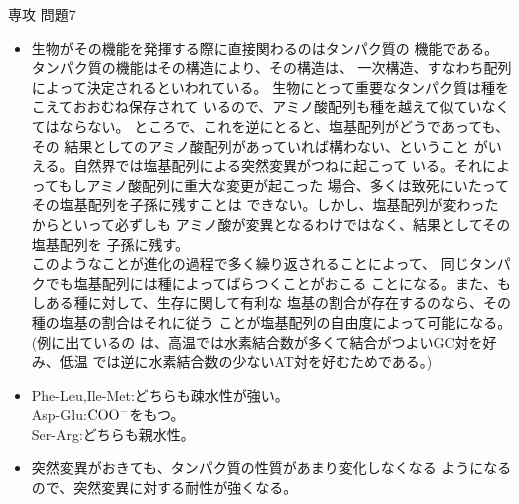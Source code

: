 \documentclass[fleqn]{jbook}
\begin{document}
\begin{answer}{専攻 問題7}{}
\begin{subanswers}
\begin{subsubanswers}
\begin{itemize}
    \item 生物がその機能を発揮する際に直接関わるのはタンパク質の
          機能である。タンパク質の機能はその構造により、その構造は、
          一次構造、すなわち配列によって決定されるといわれている。
          生物にとって重要なタンパク質は種をこえておおむね保存されて
          いるので、アミノ酸配列も種を越えて似ていなくてはならない。
          ところで、これを逆にとると、塩基配列がどうであっても、その
          結果としてのアミノ酸配列があっていれば構わない、ということ
          がいえる。自然界では塩基配列による突然変異がつねに起こって
          いる。それによってもしアミノ酸配列に重大な変更が起こった
          場合、多くは致死にいたってその塩基配列を子孫に残すことは
          できない。しかし、塩基配列が変わったからといって必ずしも
          アミノ酸が変異となるわけではなく、結果としてその塩基配列を
          子孫に残す。\\
          このようなことが進化の過程で多く繰り返されることによって、
          同じタンパクでも塩基配列には種によってばらつくことがおこる
          ことになる。また、もしある種に対して、生存に関して有利な
          塩基の割合が存在するのなら、その種の塩基の割合はそれに従う
          ことが塩基配列の自由度によって可能になる。(例に出ているの
          は、高温では水素結合数が多くて結合がつよいGC対を好み、低温
          では逆に水素結合数の少ないAT対を好むためである。)
     \end{itemize}


  \SubSubAnswer
    \begin{itemize}
    \item Phe-Leu,Ile-Met:どちらも疎水性が強い。\\
          Asp-Glu:$\rm COO^-$をもつ。\\
          Ser-Arg:どちらも親水性。
    \item 突然変異がおきても、タンパク質の性質があまり変化しなくなる
          ようになるので、突然変異に対する耐性が強くなる。
    \end{itemize}

  \end{subsubanswers}
\end{subanswers}

\end{answer}
\end{document}
